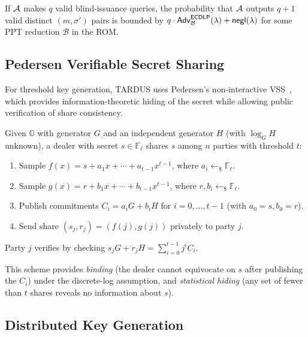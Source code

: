 \begin{theorem}
\label{thm:bs-unforgeability}
If $\mathcal{A}$ makes $q$ valid blind-issuance queries, the probability that $\mathcal{A}$ outputs $q+1$ valid distinct $(m, \sigma')$ pairs is bounded by $q \cdot \mathsf{Adv}^{\mathsf{ECDLP}}_{\mathcal{B}}(\lambda) + \mathsf{negl}(\lambda)$ for some PPT reduction $\mathcal{B}$ in the ROM.
\end{theorem}

\subsection{Pedersen Verifiable Secret Sharing}
\label{sec:vss}

For threshold key generation, TARDUS uses Pedersen's non-interactive VSS~\cite{pedersen1991}, which provides information-theoretic hiding of the secret while allowing public verification of share consistency.

\begin{construction}
\label{con:vss}
Given $\mathbb{G}$ with generator $G$ and an independent generator $H$ (with $\log_G H$ unknown), a dealer with secret $s \in \mathbb{F}_\ell$ shares $s$ among $n$ parties with threshold $t$:
\begin{enumerate}[leftmargin=2em,itemsep=0.2em]
  \item Sample $f(x) = s + a_1 x + \cdots + a_{t-1} x^{t-1}$, where $a_i \leftarrow_\$ \mathbb{F}_\ell$.
  \item Sample $g(x) = r + b_1 x + \cdots + b_{t-1} x^{t-1}$, where $r, b_i \leftarrow_\$ \mathbb{F}_\ell$.
  \item Publish commitments $C_i = a_i G + b_i H$ for $i = 0, \ldots, t-1$ (with $a_0 = s, b_0 = r$).
  \item Send share $(s_j, r_j) = (f(j), g(j))$ privately to party $j$.
\end{enumerate}
Party $j$ verifies by checking $s_j G + r_j H = \sum_{i=0}^{t-1} j^i C_i$.
\end{construction}

This scheme provides \emph{binding} (the dealer cannot equivocate on $s$ after publishing the $C_i$) under the discrete-log assumption, and \emph{statistical hiding} (any set of fewer than $t$ shares reveals no information about $s$).

\subsection{Distributed Key Generation}
\label{sec:dkg}

